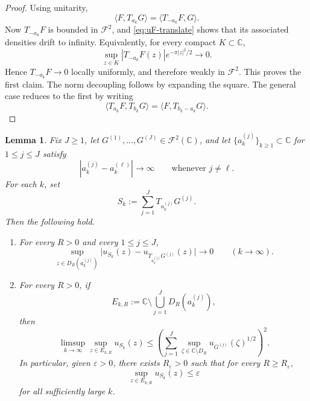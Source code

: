 \documentclass[a4paper,11pt,reqno]{amsart}
\numberwithin{equation}{section}
\theoremstyle{plain} %
\newtheorem{lemma}{Lemma}[section]
\theoremstyle{definition} %
\theoremstyle{remark}
\newcommand{\C}{\mathbb{C}}
\begin{document}
\begin{proof}
Using unitarity,
\[
\langle F,T_{a_k}G\rangle
=
\langle T_{-a_k}F,G\rangle.
\]
Now \(T_{-a_k}F\) is bounded in \(\mathcal F^2\), and
\eqref{eq:uF-translate} shows that its associated densities drift to
infinity. Equivalently, for every compact \(K\subset \C\),
\[
\sup_{z\in K}|T_{-a_k}F(z)|e^{-\pi |z|^2/2}\to 0.
\]
Hence \(T_{-a_k}F\to 0\) locally uniformly, and therefore weakly in
\(\mathcal F^2\). This proves the first claim. The norm decoupling follows by
expanding the square. The general case reduces to the first by writing
\[
\langle T_{a_k}F,T_{b_k}G\rangle
=
\langle F,T_{b_k-a_k}G\rangle.
\]
\end{proof}

\begin{lemma}\label{lem:pointwise-decoupling-global}
Fix \(J\ge 1\), let \(G^{(1)},\dots,G^{(J)}\in \mathcal F^2(\C)\), and let
\(\{a_k^{(j)}\}_{k\ge 1}\subset \C\) for \(1\le j\le J\) satisfy
\[
|a_k^{(j)}-a_k^{(\ell)}|\to\infty
\qquad\text{whenever }j\neq \ell.
\]
For each \(k\), set
\[
S_k:=\sum_{j=1}^J T_{a_k^{(j)}}G^{(j)}.
\]
Then the following hold.
\begin{enumerate}
\item[(i)] For every \(R>0\) and every \(1\le j\le J\),
\[
\sup_{z\in D_R(a_k^{(j)})}
\big|u_{S_k}(z)-u_{T_{a_k^{(j)}}G^{(j)}}(z)\big|
\to 0
\qquad (k\to\infty).
\]

\item[(ii)] For every \(R>0\), if
\[
E_{k,R}:=\C\setminus \bigcup_{j=1}^J D_R(a_k^{(j)}),
\]
then
\[
\limsup_{k\to\infty}\sup_{z\in E_{k,R}}u_{S_k}(z)
\le
\left(
\sum_{j=1}^J
\sup_{\zeta\in \C\setminus D_R} u_{G^{(j)}}(\zeta)^{1/2}
\right)^2.
\]
In particular, given \(\varepsilon>0\), there exists \(R_\varepsilon>0\) such that
for every \(R\ge R_\varepsilon\),
\[
\sup_{z\in E_{k,R}}u_{S_k}(z)\le \varepsilon
\]
for all sufficiently large \(k\).
\end{enumerate}
\end{lemma}
\end{document}
